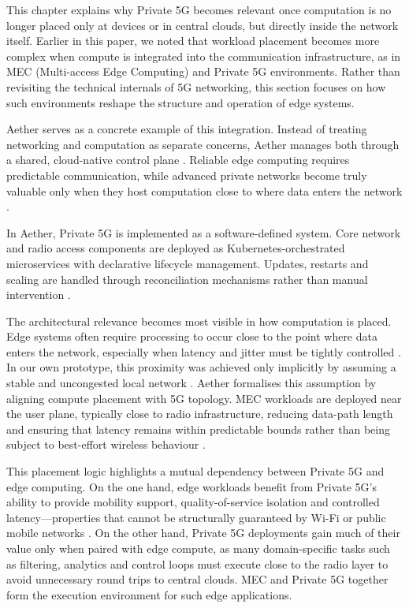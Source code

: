 This chapter explains why Private 5G becomes relevant once computation is no longer placed only at devices or in central clouds, but directly inside the network itself. Earlier in this paper, we noted that workload placement becomes more complex when compute is integrated into the communication infrastructure, as in MEC (Multi-access Edge Computing)\cite{etsi_mec_whitepaper} and Private 5G environments. Rather than revisiting the technical internals of 5G networking, this section focuses on how such environments reshape the structure and operation of edge systems.

Aether serves as a concrete example of this integration. Instead of treating networking and computation as separate concerns, Aether manages both through a shared, cloud-native control plane \cite{schrammen_edge_computing}. Reliable edge computing requires predictable communication, while advanced private networks become truly valuable only when they host computation close to where data enters the network \cite{stl_partners_edge}.

In Aether, Private 5G is implemented as a software-defined system. Core network and radio access components are deployed as Kubernetes-orchestrated microservices with declarative lifecycle management. Updates, restarts and scaling are handled through reconciliation mechanisms rather than manual intervention \cite{onf_aether_whitepaper}.

The architectural relevance becomes most visible in how computation is placed. Edge systems often require processing to occur close to the point where data enters the network, especially when latency and jitter must be tightly controlled \cite{diekmann_ericsson_5g}. In our own prototype, this proximity was achieved only implicitly by assuming a stable and uncongested local network \cite{edge_computing_report}. Aether formalises this assumption by aligning compute placement with 5G topology. MEC workloads are deployed near the user plane, typically close to radio infrastructure, reducing data-path length and ensuring that latency remains within predictable bounds rather than being subject to best-effort wireless behaviour \cite{onf_aether_whitepaper}.

This placement logic highlights a mutual dependency between Private 5G and edge computing. On the one hand, edge workloads benefit from Private 5G’s ability to provide mobility support, quality-of-service isolation and controlled latency—properties that cannot be structurally guaranteed by Wi-Fi or public mobile networks \cite{private_5g_report, onf_aether_whitepaper}. On the other hand, Private 5G deployments gain much of their value only when paired with edge compute, as many domain-specific tasks such as filtering, analytics and control loops must execute close to the radio layer to avoid unnecessary round trips to central clouds. MEC and Private 5G together form the execution environment for such edge applications.

